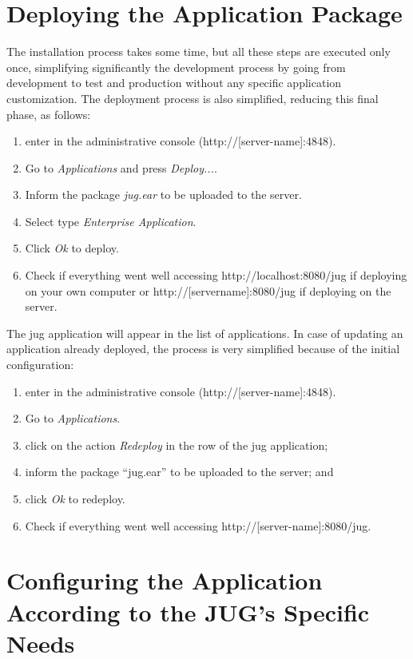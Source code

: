 \documentclass[envcountsame,envcountchap]{svmono}
\begin{document}
\section{Deploying the Application Package}

The installation process takes some time, but all these steps are executed only once, simplifying significantly the development process by going from development to test and production without any specific application customization. The deployment process is also simplified, reducing this final phase, as follows:

\begin{enumerate}
\item enter in the administrative console (http://[server-name]:4848).
\item Go to \textit{Applications} and press \textit{Deploy...}.
\item Inform the package \textit{jug.ear} to be uploaded to the server.
\item Select type \textit{Enterprise Application}.
\item Click \textit{Ok} to deploy.
\item Check if everything went well accessing http://localhost:8080/jug if deploying on your own computer or http://[servername]:8080/jug if deploying on the server.
\end{enumerate}

The jug application will appear in the list of applications. In case of updating an application already deployed, the process is very simplified because of the initial configuration:

\begin{enumerate}
\item enter in the administrative console (http://[server-name]:4848).
\item Go to \textit{Applications}.
\item click on the action \textit{Redeploy} in the row of the jug application;
\item inform the package “jug.ear” to be uploaded to the server; and
\item click \textit{Ok} to redeploy.
\item Check if everything went well accessing http://[server-name]:8080/jug.
\end{enumerate}

\section{Configuring the Application According to the JUG's Specific Needs}
\end{document}

